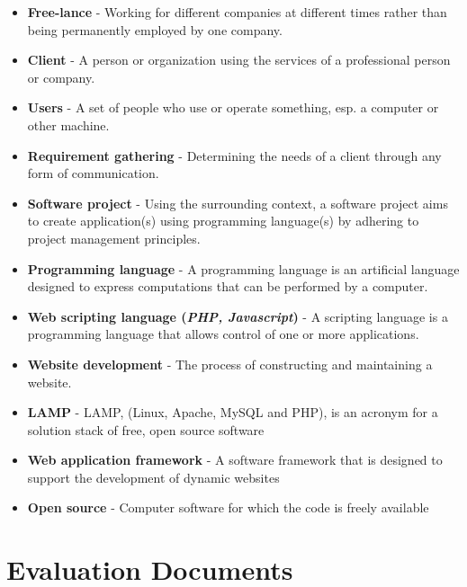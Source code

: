 \documentclass{l3proj}
\begin{document}
\begin{itemize}
\item{\textbf{Free-lance} - Working for different companies at different times rather than being permanently employed by one company.} 
\item{\textbf{Client} - A person or organization using the services of a professional person or company.} 
\item{\textbf{Users} - A set of people who use or operate something, esp. a computer or other machine.}
\item{\textbf{Requirement gathering} - Determining the needs of a client through any form of communication.}
\item{\textbf{Software project} - Using the surrounding context, a software project aims to create application(s) using programming language(s) by adhering to project management principles.}
\item{\textbf{Programming language} - A programming language is an artificial language designed to express computations that can be performed by a computer.}
\item{\textbf{Web scripting language (\textit{PHP, Javascript})} - A scripting language is a programming language that allows control of one or more applications.}
\item{\textbf{Website development} - The process of constructing and maintaining a website.}
\item{\textbf{LAMP} - LAMP, (Linux, Apache, MySQL and PHP), is an acronym for a solution stack of free, open source software}
\item{\textbf{Web application framework} - A software framework that is designed to support the development of dynamic websites }
\item{\textbf{Open source} - Computer software for which the code is freely available }
\end{itemize}


\chapter{Evaluation Documents}
\end{document}
